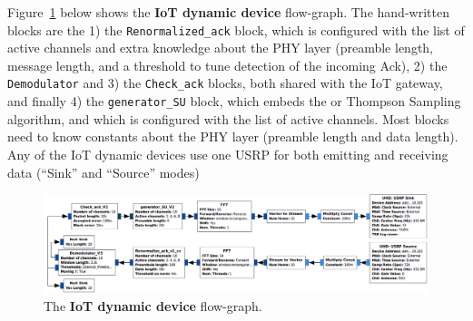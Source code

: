 Figure~\ref{fig:4app:USRP_TX_SU__v1__simple_grc} below shows the \textbf{IoT dynamic device} flow-graph.
The hand-written blocks are the 1) the \texttt{Renormalized\_ack} block, which is configured with the list of active channels and extra knowledge about the PHY layer (preamble length, message length, and a threshold to tune detection of the incoming Ack), 2) the \texttt{Demodulator} and 3) the \texttt{Check\_ack} blocks, both shared with the IoT gateway, and finally 4) the \texttt{generator\_SU} block, which embeds the \UCB{} or Thompson Sampling algorithm, and which is configured with the list of active channels. Most blocks need to know constants about the PHY layer (preamble length and data length). Any of the IoT dynamic devices use one USRP for both emitting and receiving data (``Sink'' and ``Source'' modes)

\begin{figure}[!h]
	\centering
    \includegraphics[width=1.00\textwidth]{2-Chapters/4-Chapter/Images/USRP_TX_SU__v1__simple_grc.png}
    \caption{The \textbf{IoT dynamic device} flow-graph.}
    \label{fig:4app:USRP_TX_SU__v1__simple_grc}
\end{figure}